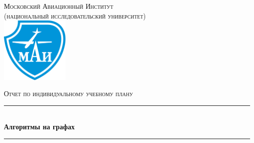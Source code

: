 \documentclass[a4paper,12pt]{article}
\begin{document}
\begin{titlepage}

\newcommand{\HRule}{\rule{\linewidth}{0.5mm}} %

\center %
 

\textsc{\large Московский Авиационный Институт\\(национальный исследовательский университет)}\\[1.5cm] %



\includegraphics[width=0.25\textwidth]{mai.png}\\[1cm]
 

\vspace{40px}

\textsc{\Large Отчет по индивидуальному учебному плану}\\[0.5cm] %



\HRule \\[0.4cm]
{ \huge \bfseries Алгоритмы на графах}\\[0.4cm] %
\HRule \\[1.5cm]



\end{titlepage}
\end{document}
